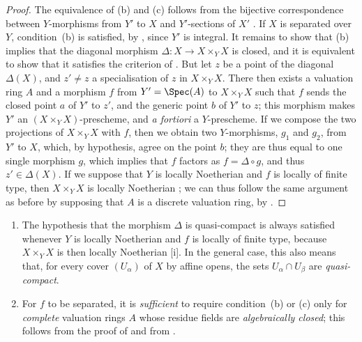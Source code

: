 \begin{proof}
The equivalence of (b) and (c) follows from the bijective correspondence between $Y$-morphisms from $Y'$ to $X$ and $Y'$-sections of $X'$ .
If $X$ is separated over $Y$, condition~(b) is satisfied, by , since $Y'$ is integral.
It remains to show that (b) implies that the diagonal morphism $\Delta:X\to X\times_Y X$ is closed, and it is equivalent to show that it satisfies the criterion of .
But let $z$ be a point of the diagonal $\Delta(X)$, and $z'\neq z$ a specialisation of $z$ in $X\times_Y X$.
There then exists  a valuation ring $A$ and a morphism $f$ from $Y'=\Spec(A)$ to $X\times_Y X$ such that $f$ sends the closed point $a$ of $Y'$ to $z'$, and the generic point $b$ of $Y'$ to $z$;
this morphism makes $Y'$ an $(X\times_Y X)$-prescheme, and \emph{a fortiori} a $Y$-prescheme.
If we compose the two projections of $X\times_Y X$ with $f$, then we obtain two $Y$-morphisms, $g_1$ and $g_2$, from $Y'$ to $X$, which, by hypothesis, agree on the point $b$;
they are thus equal to one single morphism $g$, which implies  that $f$ factors as $f=\Delta\circ g$, and thus $z'\in\Delta(X)$.
If we suppose that $Y$ is locally Noetherian and $f$ is locally of finite type, then $X\times_Y X$ is locally Noetherian ;
we can thus follow the same argument as before by supposing that $A$ is a discrete valuation ring, by .
\end{proof}

\begin{remark}[7.2.4]
\label{II.7.2.4}
\begin{enumerate}
    \item[\rm{(i)}] The hypothesis that the morphism $\Delta$ is quasi-compact is always satisfied whenever $Y$ is locally Noetherian and $f$ is locally of finite type, because $X\times_Y X$ is then locally Noetherian [i].
        In the general case, this also means that, for every cover $(U_\alpha)$ of $X$ by affine opens, the sets $U_\alpha\cap U_\beta$ are \emph{quasi-compact}.
    \item[\rm{(ii)}] For $f$ to be separated, it is \emph{sufficient} to require condition~(b) or (c) only for \emph{complete} valuation rings $A$ whose residue fields are \emph{algebraically closed};
        this follows from the proof of  and from .
\end{enumerate}
\end{remark}


